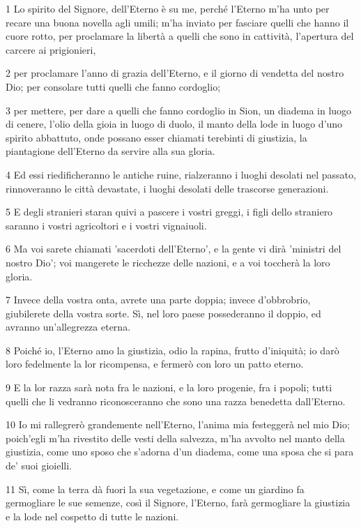 \par 1 Lo spirito del Signore, dell'Eterno è su me, perché l'Eterno m'ha unto per recare una buona novella agli umili; m'ha inviato per fasciare quelli che hanno il cuore rotto, per proclamare la libertà a quelli che sono in cattività, l'apertura del carcere ai prigionieri,
\par 2 per proclamare l'anno di grazia dell'Eterno, e il giorno di vendetta del nostro Dio; per consolare tutti quelli che fanno cordoglio;
\par 3 per mettere, per dare a quelli che fanno cordoglio in Sion, un diadema in luogo di cenere, l'olio della gioia in luogo di duolo, il manto della lode in luogo d'uno spirito abbattuto, onde possano esser chiamati terebinti di giustizia, la piantagione dell'Eterno da servire alla sua gloria.
\par 4 Ed essi riedificheranno le antiche ruine, rialzeranno i luoghi desolati nel passato, rinnoveranno le città devastate, i luoghi desolati delle trascorse generazioni.
\par 5 E degli stranieri staran quivi a pascere i vostri greggi, i figli dello straniero saranno i vostri agricoltori e i vostri vignaiuoli.
\par 6 Ma voi sarete chiamati 'sacerdoti dell'Eterno', e la gente vi dirà 'ministri del nostro Dio'; voi mangerete le ricchezze delle nazioni, e a voi toccherà la loro gloria.
\par 7 Invece della vostra onta, avrete una parte doppia; invece d'obbrobrio, giubilerete della vostra sorte. Sì, nel loro paese possederanno il doppio, ed avranno un'allegrezza eterna.
\par 8 Poiché io, l'Eterno amo la giustizia, odio la rapina, frutto d'iniquità; io darò loro fedelmente la lor ricompensa, e fermerò con loro un patto eterno.
\par 9 E la lor razza sarà nota fra le nazioni, e la loro progenie, fra i popoli; tutti quelli che li vedranno riconosceranno che sono una razza benedetta dall'Eterno.
\par 10 Io mi rallegrerò grandemente nell'Eterno, l'anima mia festeggerà nel mio Dio; poich'egli m'ha rivestito delle vesti della salvezza, m'ha avvolto nel manto della giustizia, come uno sposo che s'adorna d'un diadema, come una sposa che si para de' suoi gioielli.
\par 11 Sì, come la terra dà fuori la sua vegetazione, e come un giardino fa germogliare le sue semenze, così il Signore, l'Eterno, farà germogliare la giustizia e la lode nel cospetto di tutte le nazioni.

